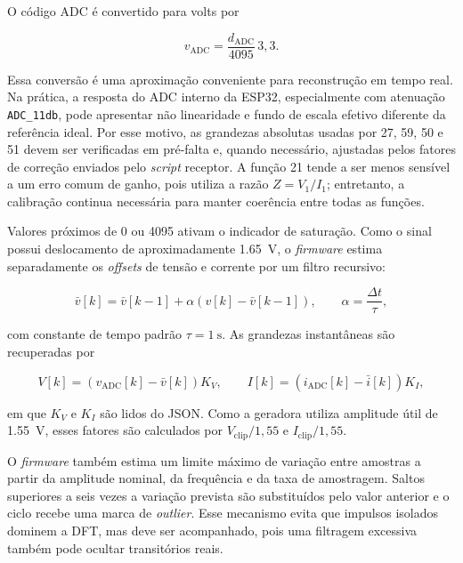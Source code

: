 O código ADC é convertido para volts por

\begin{equation}
  v_{\mathrm{ADC}}=\frac{d_{\mathrm{ADC}}}{4095}\,3{,}3.
\end{equation}

Essa conversão é uma aproximação conveniente para reconstrução em tempo real. Na prática, a resposta do ADC interno da ESP32, especialmente com atenuação \texttt{ADC\_11db}, pode apresentar não linearidade e fundo de escala efetivo diferente da referência ideal. Por esse motivo, as grandezas absolutas usadas por 27, 59, 50 e 51 devem ser verificadas em pré-falta e, quando necessário, ajustadas pelos fatores de correção enviados pelo \textit{script} receptor. A função 21 tende a ser menos sensível a um erro comum de ganho, pois utiliza a razão $Z=V_1/I_1$; entretanto, a calibração continua necessária para manter coerência entre todas as funções.

Valores próximos de 0 ou 4095 ativam o indicador de saturação. Como o sinal possui deslocamento de aproximadamente \SI{1,65}{\volt}, o \textit{firmware} estima separadamente os \textit{offsets} de tensão e corrente por um filtro recursivo:

\begin{equation}
  \bar{v}[k]=\bar{v}[k-1]+\alpha\left(v[k]-\bar{v}[k-1]\right),
  \qquad \alpha=\frac{\Delta t}{\tau},
  \label{eq:filtro-offset}
\end{equation}

com constante de tempo padrão $\tau=\SI{1}{\second}$. As grandezas instantâneas são recuperadas por

\begin{equation}
  V[k]=(v_{\mathrm{ADC}}[k]-\bar{v}[k])K_V, \qquad
  I[k]=(i_{\mathrm{ADC}}[k]-\bar{i}[k])K_I,
  \label{eq:reconstrucao-engenharia}
\end{equation}

em que $K_V$ e $K_I$ são lidos do JSON. Como a geradora utiliza amplitude útil de \SI{1,55}{\volt}, esses fatores são calculados por $V_{\mathrm{clip}}/1{,}55$ e $I_{\mathrm{clip}}/1{,}55$.

O \textit{firmware} também estima um limite máximo de variação entre amostras a partir da amplitude nominal, da frequência e da taxa de amostragem. Saltos superiores a seis vezes a variação prevista são substituídos pelo valor anterior e o ciclo recebe uma marca de \textit{outlier}. Esse mecanismo evita que impulsos isolados dominem a DFT, mas deve ser acompanhado, pois uma filtragem excessiva também pode ocultar transitórios reais.


